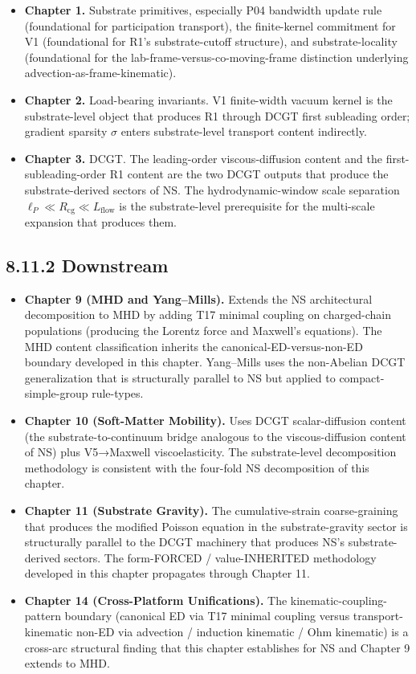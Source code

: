 \documentclass[11pt]{book}
\begin{document}
\begin{itemize}
\item \textbf{Chapter 1.} Substrate primitives, especially P04 bandwidth update rule (foundational for participation transport), the finite-kernel commitment for V1 (foundational for R1's substrate-cutoff structure), and substrate-locality (foundational for the lab-frame-versus-co-moving-frame distinction underlying advection-as-frame-kinematic).
\item \textbf{Chapter 2.} Load-bearing invariants. V1 finite-width vacuum kernel is the substrate-level object that produces R1 through DCGT first subleading order; gradient sparsity $\sigma$ enters substrate-level transport content indirectly.
\item \textbf{Chapter 3.} DCGT. The leading-order viscous-diffusion content and the first-subleading-order R1 content are the two DCGT outputs that produce the substrate-derived sectors of NS. The hydrodynamic-window scale separation $\ell_P \ll R_\mathrm{cg} \ll L_\mathrm{flow}$ is the substrate-level prerequisite for the multi-scale expansion that produces them.
\end{itemize}

\subsection{8.11.2 Downstream}

\begin{itemize}
\item \textbf{Chapter 9 (MHD and Yang–Mills).} Extends the NS architectural decomposition to MHD by adding T17 minimal coupling on charged-chain populations (producing the Lorentz force and Maxwell's equations). The MHD content classification inherits the canonical-ED-versus-non-ED boundary developed in this chapter. Yang–Mills uses the non-Abelian DCGT generalization that is structurally parallel to NS but applied to compact-simple-group rule-types.
\item \textbf{Chapter 10 (Soft-Matter Mobility).} Uses DCGT scalar-diffusion content (the substrate-to-continuum bridge analogous to the viscous-diffusion content of NS) plus V5→Maxwell viscoelasticity. The substrate-level decomposition methodology is consistent with the four-fold NS decomposition of this chapter.
\item \textbf{Chapter 11 (Substrate Gravity).} The cumulative-strain coarse-graining that produces the modified Poisson equation in the substrate-gravity sector is structurally parallel to the DCGT machinery that produces NS's substrate-derived sectors. The form-FORCED / value-INHERITED methodology developed in this chapter propagates through Chapter 11.
\item \textbf{Chapter 14 (Cross-Platform Unifications).} The kinematic-coupling-pattern boundary (canonical ED via T17 minimal coupling versus transport-kinematic non-ED via advection / induction kinematic / Ohm kinematic) is a cross-arc structural finding that this chapter establishes for NS and Chapter 9 extends to MHD.
\end{itemize}
\end{document}
